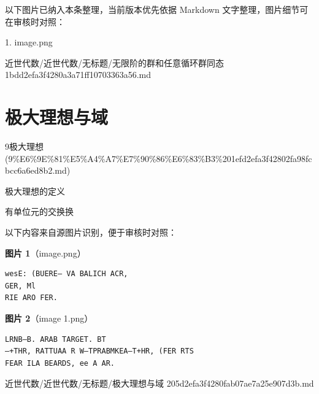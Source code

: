 \begin{note}[关联图片]
以下图片已纳入本条整理，当前版本优先依据 Markdown 文字整理，图片细节可在审核时对照：

1. image.png\\

\end{note}

\begin{note}[来源路径]

近世代数/近世代数/无标题/无限阶的群和任意循环群同态 1bdd2efa3f4280a3a71ff10703363a56.md

\end{note}

\section*{极大理想与域}

\begin{note}[来源上级主题]

9极大理想 (9\%E6\%9E\%81\%E5\%A4\%A7\%E7\%90\%86\%E6\%83\%B3\%201efd2efa3f42802fa98fcbcc6a6ed8b2.md)

\end{note}

\begin{note}[极大理想与域]

极大理想的定义

有单位元的交换换

\end{note}

\begin{note}
以下内容来自源图片识别，便于审核时对照：

\textbf{图片 1}（image.png）
\begin{Verbatim}[fontsize=\small]
wesE: (BUERE— VA BALICH ACR,
GER, Ml
RIE ARO FER.
\end{Verbatim}

\textbf{图片 2}（image 1.png）
\begin{Verbatim}[fontsize=\small]
LRNB—B. ARAB TARGET. BT
—+THR, RATTUAA R W—TPRABMKEA—T+HR, (FER RTS
FEAR ILA BEARDS, ee A AR.
\end{Verbatim}

\end{note}

\begin{note}[来源路径]

近世代数/近世代数/无标题/极大理想与域 205d2efa3f4280fab07ae7a25e907d3b.md

\end{note}

